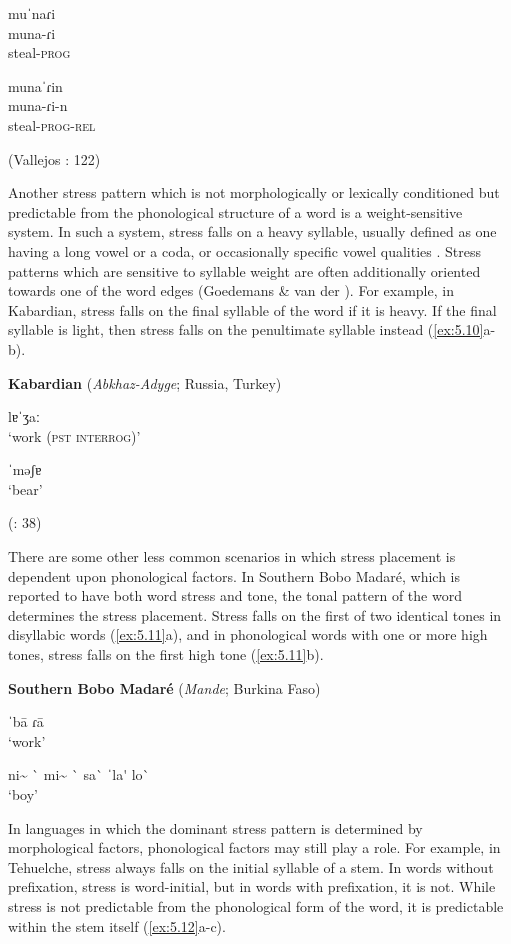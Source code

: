 \ex  muˈnaɾi\\
  muna-ɾi\\
steal-\textsc{prog}

\ex  munaˈɾin\\
  muna-ɾi-n\\
steal-\textsc{prog}-\textsc{rel}

(Vallejos \citealt{Yopán2010}: 122)
\z
\z

  Another stress pattern which is not morphologically or lexically conditioned but predictable from the phonological structure of a word is a weight-sensitive system. In such a system, stress falls on a heavy syllable, usually defined as one having a long vowel or a coda, or occasionally specific vowel qualities \citep{Gordon2006}. Stress patterns which are sensitive to syllable weight are often additionally oriented towards one of the word edges (Goedemans \& van der \citealt{Hulst2013b}). For example, in Kabardian, stress falls on the final syllable of the word if it is heavy. If the final syllable is light, then stress falls on the penultimate syllable instead (\ref{ex:5.10}a-b).

\ea\label{ex:5.10}
  \textbf{Kabardian} (\textit{Abkhaz-Adyge}; Russia, Turkey)

\ea   lɐˈʒaː\\
\glt ‘work (\textsc{pst} \textsc{interrog})’

\ex  ˈməʃɐ\\
\glt ‘bear’

(\citealt{GordonApplebaum2010}: 38)
\z
\z

  There are some other less common scenarios in which stress placement is dependent upon phonological factors. In Southern Bobo Madaré, which is reported to have both word stress and tone, the tonal pattern of the word determines the stress placement. Stress falls on the first of two identical tones in disyllabic words (\ref{ex:5.11}a), and in phonological words with one or more high tones, stress falls on the first high tone (\ref{ex:5.11}b).

\ea\label{ex:5.11}
  \textbf{Southern Bobo Madaré} (\textit{Mande}; Burkina Faso)

\ea  \textsf{ˈ}ba\textsf{\={} }ɾa\textsf{\={} }\\
\glt ‘work’

\ex  ni\~{} \`{} mi\~{} \`{} sa\`{} ˈla\'{} lo\`{} \\
\glt ‘boy’
\citep[110]{Morse1976}
\z
\z

  In languages in which the dominant stress pattern is determined by morphological factors, phonological factors may still play a role. For example, in Tehuelche, stress always falls on the initial syllable of a stem. In words without prefixation, stress is word-initial, but in words with prefixation, it is not. While stress is not predictable from the phonological form of the word, it is predictable within the stem itself (\ref{ex:5.12}a-c).


